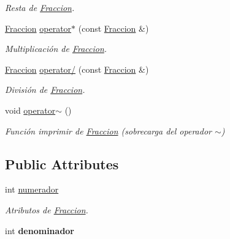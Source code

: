 \begin{DoxyCompactItemize}
\begin{DoxyCompactList}\small\item\em Resta de \hyperlink{class_fraccion}{Fraccion}. \end{DoxyCompactList}\item 
\hypertarget{class_fraccion_ab6634c35da9689efe4e99a190317d5a2}{\hyperlink{class_fraccion}{Fraccion} \hyperlink{class_fraccion_ab6634c35da9689efe4e99a190317d5a2}{operator$\ast$} (const \hyperlink{class_fraccion}{Fraccion} \&)}\label{class_fraccion_ab6634c35da9689efe4e99a190317d5a2}

\begin{DoxyCompactList}\small\item\em Multiplicación de \hyperlink{class_fraccion}{Fraccion}. \end{DoxyCompactList}\item 
\hypertarget{class_fraccion_a02cbdcc3a8086bc19c3e5f3372e316b5}{\hyperlink{class_fraccion}{Fraccion} \hyperlink{class_fraccion_a02cbdcc3a8086bc19c3e5f3372e316b5}{operator/} (const \hyperlink{class_fraccion}{Fraccion} \&)}\label{class_fraccion_a02cbdcc3a8086bc19c3e5f3372e316b5}

\begin{DoxyCompactList}\small\item\em División de \hyperlink{class_fraccion}{Fraccion}. \end{DoxyCompactList}\item 
\hypertarget{class_fraccion_a6ba2dac78e5ef60d6860d39ba3489bb1}{void \hyperlink{class_fraccion_a6ba2dac78e5ef60d6860d39ba3489bb1}{operator$\sim$} ()}\label{class_fraccion_a6ba2dac78e5ef60d6860d39ba3489bb1}

\begin{DoxyCompactList}\small\item\em Función imprimir de \hyperlink{class_fraccion}{Fraccion} (sobrecarga del operador $\sim$) \end{DoxyCompactList}\end{DoxyCompactItemize}
\subsection*{Public Attributes}
\begin{DoxyCompactItemize}
\item 
\hypertarget{class_fraccion_a88946835a0fe344bf223ac98e23f4e4a}{int \hyperlink{class_fraccion_a88946835a0fe344bf223ac98e23f4e4a}{numerador}}\label{class_fraccion_a88946835a0fe344bf223ac98e23f4e4a}

\begin{DoxyCompactList}\small\item\em Atributos de \hyperlink{class_fraccion}{Fraccion}. \end{DoxyCompactList}\item 
\hypertarget{class_fraccion_a3857a3268d25091dcb00decf4d4516cd}{int {\bfseries denominador}}\label{class_fraccion_a3857a3268d25091dcb00decf4d4516cd}

\end{DoxyCompactItemize}



